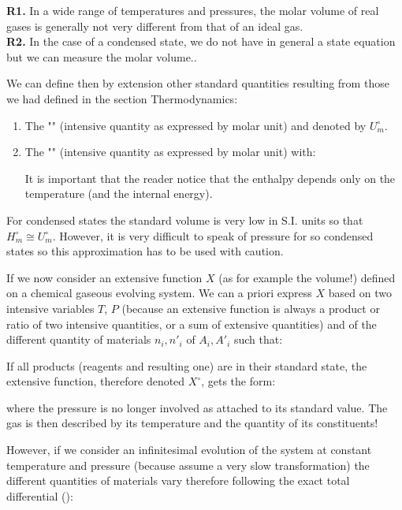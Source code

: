 	\begin{tcolorbox}[title=Remarks,colframe=black,arc=10pt]
	\textbf{R1.} In a wide range of temperatures and pressures, the molar volume of real gases is generally not very different from that of an ideal gas.\\
	
	\textbf{R2.} In the case of a condensed state, we do not have in general a state equation but we can measure the molar volume..
	\end{tcolorbox}
	We can define then by extension other standard quantities resulting from those we had defined in the section Thermodynamics:
	\begin{enumerate}
		\item The "" (intensive quantity as expressed by molar unit) and denoted by $U_m^\circ$.

		\item The "" (intensive quantity as expressed by molar unit) with:
		
		It is important that the reader notice that the enthalpy depends only on the temperature (and the internal energy).
	\end{enumerate}
	\begin{tcolorbox}[title=Remark,colframe=black,arc=10pt]
	For condensed states the standard volume is very low in S.I. units so that $H_m^\circ\cong U_m^\circ$. However, it is very difficult to speak of pressure for so condensed states so this approximation has to be used with caution.
	\end{tcolorbox}	
	If we now consider an extensive function $X$ (as for example the volume!) defined on a chemical gaseous evolving system. We can a priori express $X$ based on two intensive variables $T$, $P$ (because an extensive function is always a product or ratio of two intensive quantities, or a sum of extensive quantities) and of the different quantity of materials $n_i,{n'}_i$ of $A_i,{A'}_i$ such that:
	
	If all products (reagents and resulting one) are in their standard state, the extensive function, therefore denoted $X^\circ$, gets the form:
	
	where the pressure is no longer involved as attached to its standard value. The gas is then described by its temperature and the quantity of its constituents!
	
	However, if we consider an infinitesimal evolution of the system at constant temperature and pressure (because assume a very slow transformation) the different quantities of materials vary therefore following the exact total differential ():
	
